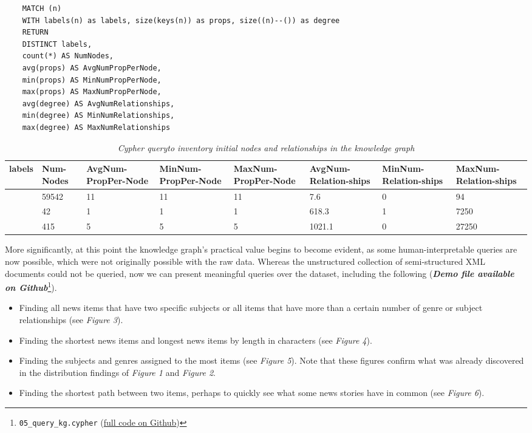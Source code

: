 \documentclass[11pt]{article}
\begin{document}
  \begin{table}
    \begin{lstlisting}
    MATCH (n)
    WITH labels(n) as labels, size(keys(n)) as props, size((n)--()) as degree
    RETURN
    DISTINCT labels,
    count(*) AS NumNodes,
    avg(props) AS AvgNumPropPerNode,
    min(props) AS MinNumPropPerNode,
    max(props) AS MaxNumPropPerNode,
    avg(degree) AS AvgNumRelationships,
    min(degree) AS MinNumRelationships,
    max(degree) AS MaxNumRelationships
    \end{lstlisting}

    \begin{tabular}{ |p{2cm}|p{1cm}|p{1.5cm}|p{1.5cm}|p{1.5cm}|p{1.5cm}|p{1.5cm}|p{1.5cm}| }
    \hline
    labels&Num-Nodes&AvgNum-PropPer-Node&MinNum-PropPer-Node&MaxNum-PropPer-Node&AvgNum-Relation-ships&MinNum-Relation-ships&MaxNum-Relation-ships\\
    \hline
    [``NewsItem'']&59542&11&11&11&7.6&0&94\\
    \hline
    [``Genre'']&42&1&1&1&618.3&1&7250\\
    \hline
    [``Subject'']&415&5&5&5&1021.1&0&27250\\
    \hline
    \end{tabular}

    \caption{\textit{Cypher query\protect \footnotemark to inventory initial nodes and relationships in the knowledge graph}}
  \end{table}

  
  More significantly, at this point the knowledge graph's practical value begins to become evident, as some human-interpretable queries are now possible, which were not originally possible with the raw data. Whereas the unstructured collection of semi-structured XML documents could not be queried, now we can present meaningful queries over the dataset, including the following (\textit{\textbf{Demo file available on Github}}\footnote{\lstinline{05_query_kg.cypher} (\href{https://github.com/Birkbeck/msc-data-science-project-2020_21---files-heychrisek/}{full code on Github})}).

  \begin{itemize}
    \item{Finding all news items that have two specific subjects or all items that have more than a certain number of genre or subject relationships (see \textit{Figure 3}).}
    \item{Finding the shortest news items and longest news items by length in characters (see \textit{Figure 4}).}
    \item{Finding the subjects and genres assigned to the most items (see \textit{Figure 5}). Note that these figures confirm what was already discovered in the distribution findings of \textit{Figure 1} and \textit{Figure 2}.}
    \item{Finding the shortest path between two items, perhaps to quickly see what some news stories have in common (see \textit{Figure 6}).}
  \end{itemize}
\end{document}
